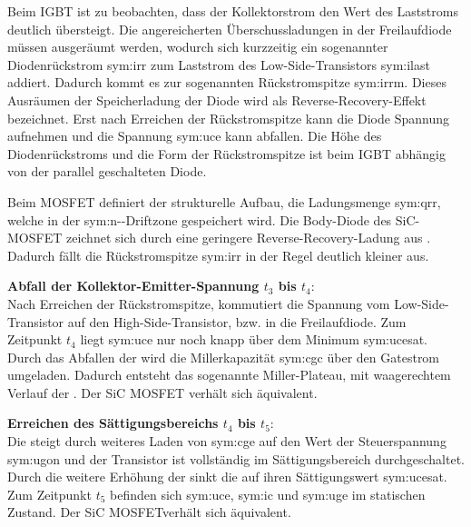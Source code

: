 Beim \gls{IGBT} ist zu beobachten, dass der Kollektorstrom den Wert des Laststroms deutlich übersteigt. Die angereicherten Überschussladungen in der Freilaufdiode müssen ausgeräumt werden, wodurch sich kurzzeitig ein sogenannter Diodenrückstrom \gls{sym:irr} zum Laststrom des Low-Side-Transistors \gls{sym:ilast} addiert. Dadurch kommt es zur sogenannten Rückstromspitze \gls{sym:irrm}. Dieses Ausräumen der Speicherladung der Diode wird als Reverse-Recovery-Effekt bezeichnet. Erst nach Erreichen der Rückstromspitze kann die Diode Spannung aufnehmen und die Spannung \gls{sym:uce} kann abfallen.
Die Höhe des Diodenrückstroms und die Form der Rückstromspitze ist beim \gls{IGBT} abhängig von der parallel geschalteten Diode. 

Beim \gls{MOSFET} definiert der strukturelle Aufbau, die Ladungsmenge \gls{sym:qrr}, welche in der \gls{sym:n-}-Driftzone gespeichert wird. Die Body-Diode des \gls{SiC}-\gls{MOSFET} zeichnet sich durch eine geringere Reverse-Recovery-Ladung aus \cite{Rohmsican}. Dadurch fällt die Rückstromspitze \gls{sym:irr} in der Regel deutlich kleiner aus. 

\textbf{Abfall der Kollektor-Emitter-Spannung $ t_3 $ bis $t_4$}:\\
Nach Erreichen der Rückstromspitze, kommutiert die Spannung vom Low-Side-Transistor auf den High-Side-Transistor, bzw. in die Freilaufdiode. Zum Zeitpunkt $t_4$ liegt \gls{sym:uce} nur noch knapp über dem Minimum \gls{sym:ucesat}. Durch das Abfallen der  wird die Millerkapazität \gls{sym:cgc} über den Gatestrom umgeladen. Dadurch entsteht das sogenannte Miller-Plateau, mit waagerechtem Verlauf der . Der \gls{SiC} \gls{MOSFET} verhält sich äquivalent.

\textbf{Erreichen des Sättigungsbereichs $ t_4 $ bis $t_5$}:\\
Die  steigt durch weiteres Laden von \gls{sym:cge} auf den Wert der Steuerspannung \gls{sym:ugon} und der Transistor ist vollständig im Sättigungsbereich durchgeschaltet. Durch die weitere Erhöhung der  sinkt die  auf ihren Sättigungswert \gls{sym:ucesat}. Zum Zeitpunkt $t_5$ befinden sich \gls{sym:uce}, \gls{sym:ic} und \gls{sym:uge} im statischen Zustand. Der \gls{SiC} \gls{MOSFET}verhält sich äquivalent. 

